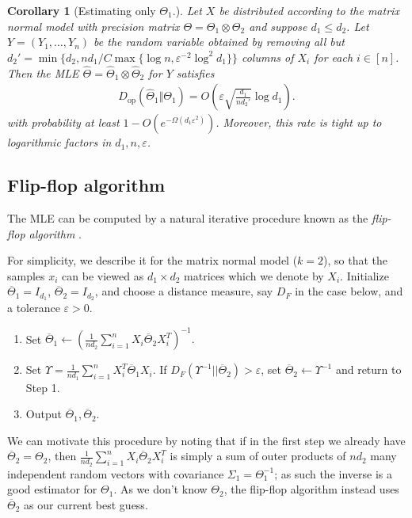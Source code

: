 \documentclass[aos]{imsart}
\newtheorem{corollary}[theorem]{Corollary}
\theoremstyle{definition}
\numberwithin{equation}{section}
\DeclareMathOperator{\op}{op}
\newcommand{\htheta}{\widehat{\Theta}}
\newcommand{\ot}{\otimes}
\newcommand{\eps}{\varepsilon}
\newcommand{\samp}{x}
\begin{document}
\begin{corollary}[Estimating only $\Theta_1$.] Let $X$ be distributed according to the matrix normal model with precision matrix $\Theta = \Theta_1 \ot \Theta_2$ and suppose $d_1 \leq d_2$.
Let $Y = (Y_1, \dots, Y_n)$ be the random variable obtained by removing all but $d_2' = \min\{ d_2, n d_1/C \max\{ \log n, \eps^{-2} \log^2 d_1\}\}$ columns of $X_i$ for each $i \in [n]$. 
Then the MLE $\htheta = \htheta_1 \ot \htheta_2$ for $Y$ satisfies 
\begin{align*}
  D_{\op}(\widehat{\Theta}_1 \Vert \Theta_1) = O\left(\eps \sqrt{\frac{d_1}{nd_2'}} \log d_1\right).
  \end{align*}
 with probability at least  $1 - O(e^{ - \Omega( d_1 \eps^2)})$. 
 Moreover, this rate is tight up to logarithmic factors in $d_1, n, \eps$. 
\end{corollary}

\subsection{Flip-flop algorithm}
The MLE can be computed by a natural iterative procedure known as the \emph{flip-flop algorithm} \citep{dutilleul1999mle,gurvits2004classical}.

For simplicity, we describe it for the matrix normal model ($k=2$), so that the samples $\samp_i$ can be viewed as $d_1\times d_2$ matrices which we denote by $X_i$.
Initialize $\overline{\Theta}_1 = I_{d_1}$, $\overline{\Theta}_2 = I_{d_2}$, and choose a distance measure, say $D_F$ in the case below, and a tolerance $\eps > 0$.
\begin{enumerate}
\item Set $\overline{\Theta}_1 \leftarrow (\frac{1}{n d_2} \sum_{i = 1}^n X_i \overline{\Theta}_2 X_i^T)^{-1}.$
\item\label{it:sinkhorn second} Set $\Upsilon = \frac{1}{n d_1} \sum_{i = 1}^n X_i^T \overline{\Theta}_1 X_i$.
If $D_F( \Upsilon^{-1}|| \overline{\Theta}_2) > \eps$, set $\overline{\Theta}_2 \leftarrow \Upsilon^{-1}$ and return to Step 1.
\item Output $\overline{\Theta}_1, \overline{\Theta}_2$.
\end{enumerate}

We can motivate this procedure by noting that if in the first step we already have $\overline{\Theta}_2 = \Theta_2$, then $\frac{1}{n d_2} \sum_{i = 1}^n X_i \overline{\Theta}_2 X_i^T$ is simply a sum of outer products of $nd_2$ many independent random vectors with covariance $\Sigma_1 = \Theta_1^{-1}$; as such the inverse is a good estimator for $\Theta_1$.
As we don't know $\Theta_2$, the flip-flop algorithm instead uses $\overline{\Theta}_2$ as our current best guess.
\end{document}
